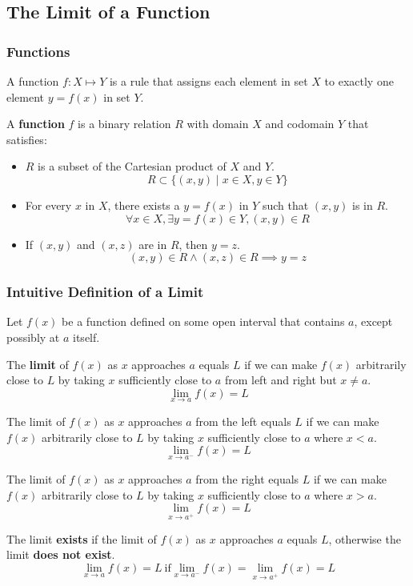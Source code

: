 \subsection{The Limit of a Function}

\subsubsection{Functions}
A function \(f:X\mapsto Y\) is a rule that assigns each element in set \(X\)
to exactly one element \(y=f(x)\) in set \(Y\).
\begin{definition}
    A \textbf{function} \(f\) is a binary relation \(R\) with domain \(X\) and
    codomain \(Y\) that satisfies:
    \begin{itemize}
        \item \(R\) is a subset of the Cartesian product of \(X\) and \(Y\).
        \[R\subset\{(x,y)\mid x\in X,y\in Y\}\]
        \item For every \(x\) in \(X\), there exists a \(y=f(x)\) in \(Y\)
        such that \((x,y)\) is in \(R\).
        \[\forall x\in X,\exists y=f(x)\in Y,(x,y)\in R\]
        \item If \((x,y)\) and \((x,z)\) are in \(R\), then \(y=z\).
        \[(x,y)\in R \wedge (x,z)\in R \implies y=z\]
    \end{itemize}
\end{definition}

\subsubsection{Intuitive Definition of a Limit}
Let \(f(x)\) be a function defined on some open interval that contains \(a\),
except possibly at \(a\) itself.
\begin{definition}
    The \textbf{limit} of \(f(x)\) as \(x\) approaches \(a\) equals \(L\) if
    we can make \(f(x)\) arbitrarily close to \(L\) by taking \(x\)
    sufficiently close to \(a\) from left and right but \(x\neq a\).
    \[\lim_{x\to a}f(x)=L\]
\end{definition}
\begin{definition}
    The limit of \(f(x)\) as \(x\) approaches \(a\) from the left equals \(L\)
    if we can make \(f(x)\) arbitrarily close to \(L\) by taking \(x\)
    sufficiently close to \(a\) where \(x<a\).
    \[\lim_{x\to a^-}f(x)=L\]
\end{definition}
\begin{definition}
    The limit of \(f(x)\) as \(x\) approaches \(a\) from the right equals
    \(L\) if we can make \(f(x)\) arbitrarily close to \(L\) by taking \(x\)
    sufficiently close to \(a\) where \(x>a\).
    \[\lim_{x\to a^+}f(x)=L\]
\end{definition}
The limit \textbf{exists} if the limit of \(f(x)\) as \(x\) approaches \(a\)
equals \(L\), otherwise the limit \textbf{does not exist}.
\[\lim_{x\to a}f(x)=L\ \text{if} \lim_{x\to a^-}f(x)=\lim_{x\to a^+}f(x)=L\]